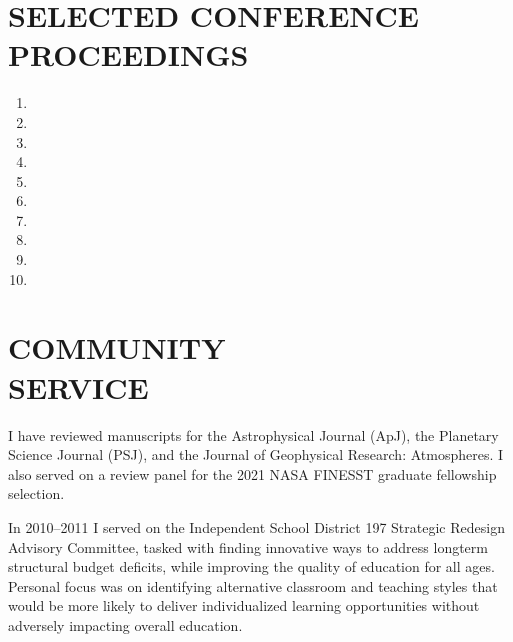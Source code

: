 \documentclass[10pt]{res} %
\begin{document}
\begin{resume}
\section{SELECTED CONFERENCE PROCEEDINGS}

\begin{enumerate}
\item {}
\item {}
\item {}
\item {}
\item {}
\item {}
\item {}
\item {}
\item {}
\item {}
\end{enumerate}


% 
\section{COMMUNITY \\ SERVICE}

I have reviewed manuscripts for the Astrophysical Journal (ApJ), the Planetary Science Journal (PSJ), and the Journal of Geophysical Research: Atmospheres. I also served on a review panel for the 2021 NASA FINESST graduate fellowship selection.  

In 2010--2011 I served on the Independent School District 197 Strategic Redesign Advisory Committee, tasked with finding innovative ways to address longterm structural budget deficits, while improving the quality of education for all ages. Personal focus was on identifying alternative classroom and teaching styles that would be more likely to deliver individualized learning opportunities without adversely impacting overall education.



\end{resume}
\end{document}
